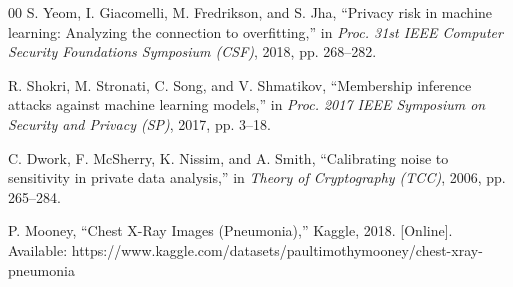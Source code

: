 \documentclass[conference]{IEEEtran}
\begin{document}
\begin{thebibliography}{00}
 S. Yeom, I. Giacomelli, M. Fredrikson, and S. Jha, ``Privacy risk in machine learning: Analyzing the connection to overfitting,'' in \textit{Proc. 31st IEEE Computer Security Foundations Symposium (CSF)}, 2018, pp. 268--282.

 R. Shokri, M. Stronati, C. Song, and V. Shmatikov, ``Membership inference attacks against machine learning models,'' in \textit{Proc. 2017 IEEE Symposium on Security and Privacy (SP)}, 2017, pp. 3--18.

 C. Dwork, F. McSherry, K. Nissim, and A. Smith, ``Calibrating noise to sensitivity in private data analysis,'' in \textit{Theory of Cryptography (TCC)}, 2006, pp. 265--284.

 P. Mooney, ``Chest X-Ray Images (Pneumonia),'' Kaggle, 2018. [Online]. Available: https://www.kaggle.com/datasets/paultimothymooney/chest-xray-pneumonia

\end{thebibliography}
\end{document}
